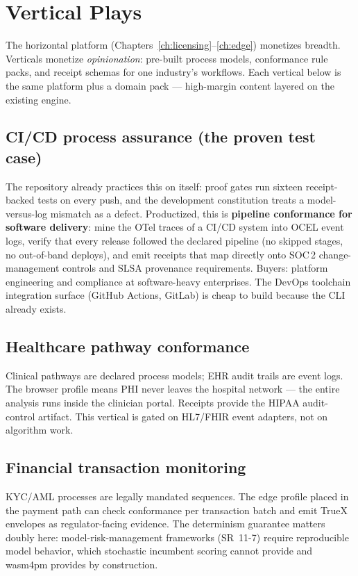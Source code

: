\chapter{Vertical Plays}
\label{ch:verticals}

The horizontal platform (Chapters~\ref{ch:licensing}--\ref{ch:edge})
monetizes breadth. Verticals monetize \emph{opinionation}: pre-built process
models, conformance rule packs, and receipt schemas for one industry's
workflows. Each vertical below is the same platform plus a domain pack ---
high-margin content layered on the existing engine.

\section{CI/CD process assurance (the proven test case)}

The repository already practices this on itself: proof gates run sixteen
receipt-backed tests on every push, and the development constitution treats
a model-versus-log mismatch as a defect. Productized, this is
\textbf{pipeline conformance for software delivery}: mine the OTel traces of
a CI/CD system into OCEL event logs, verify that every release followed the
declared pipeline (no skipped stages, no out-of-band deploys), and emit
receipts that map directly onto SOC\,2 change-management controls and SLSA
provenance requirements. Buyers: platform engineering and compliance at
software-heavy enterprises. The DevOps toolchain integration surface (GitHub
Actions, GitLab) is cheap to build because the CLI already exists.

\section{Healthcare pathway conformance}

Clinical pathways are declared process models; EHR audit trails are event
logs. The browser profile means PHI never leaves the hospital network ---
the entire analysis runs inside the clinician portal. Receipts provide the
HIPAA audit-control artifact. This vertical is gated on HL7/FHIR event
adapters, not on algorithm work.

\section{Financial transaction monitoring}

KYC/AML processes are legally mandated sequences. The edge profile placed
in the payment path can check conformance per transaction batch and emit
TrueX envelopes as regulator-facing evidence. The determinism guarantee
matters doubly here: model-risk-management frameworks (SR~11-7) require
reproducible model behavior, which stochastic incumbent scoring cannot
provide and wasm4pm provides by construction.


